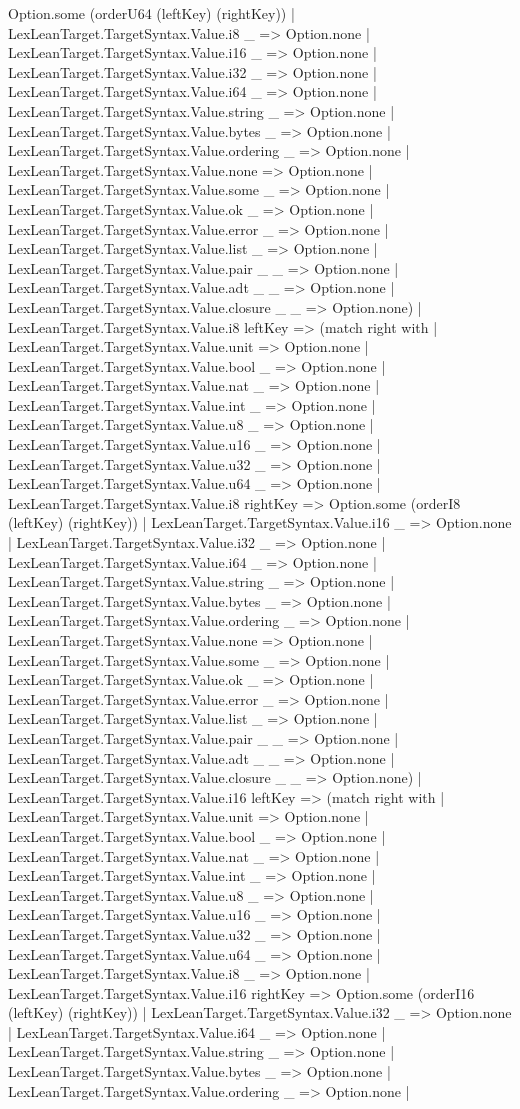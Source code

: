 \documentclass[11pt]{article}
\begin{document}
Option.some (orderU64 (leftKey) (rightKey)) | LexLeanTarget.TargetSyntax.Value.i8 \_ => Option.none | LexLeanTarget.TargetSyntax.Value.i16 \_ => Option.none | LexLeanTarget.TargetSyntax.Value.i32 \_ => Option.none | LexLeanTarget.TargetSyntax.Value.i64 \_ => Option.none | LexLeanTarget.TargetSyntax.Value.string \_ => Option.none | LexLeanTarget.TargetSyntax.Value.bytes \_ => Option.none | LexLeanTarget.TargetSyntax.Value.ordering \_ => Option.none | LexLeanTarget.TargetSyntax.Value.none => Option.none | LexLeanTarget.TargetSyntax.Value.some \_ => Option.none | LexLeanTarget.TargetSyntax.Value.ok \_ => Option.none | LexLeanTarget.TargetSyntax.Value.error \_ => Option.none | LexLeanTarget.TargetSyntax.Value.list \_ => Option.none | LexLeanTarget.TargetSyntax.Value.pair \_ \_ => Option.none | LexLeanTarget.TargetSyntax.Value.adt \_ \_ => Option.none | LexLeanTarget.TargetSyntax.Value.closure \_ \_ => Option.none) | LexLeanTarget.TargetSyntax.Value.i8 leftKey => (match right with | LexLeanTarget.TargetSyntax.Value.unit => Option.none | LexLeanTarget.TargetSyntax.Value.bool \_ => Option.none | LexLeanTarget.TargetSyntax.Value.nat \_ => Option.none | LexLeanTarget.TargetSyntax.Value.int \_ => Option.none | LexLeanTarget.TargetSyntax.Value.u8 \_ => Option.none | LexLeanTarget.TargetSyntax.Value.u16 \_ => Option.none | LexLeanTarget.TargetSyntax.Value.u32 \_ => Option.none | LexLeanTarget.TargetSyntax.Value.u64 \_ => Option.none | LexLeanTarget.TargetSyntax.Value.i8 rightKey => Option.some (orderI8 (leftKey) (rightKey)) | LexLeanTarget.TargetSyntax.Value.i16 \_ => Option.none | LexLeanTarget.TargetSyntax.Value.i32 \_ => Option.none | LexLeanTarget.TargetSyntax.Value.i64 \_ => Option.none | LexLeanTarget.TargetSyntax.Value.string \_ => Option.none | LexLeanTarget.TargetSyntax.Value.bytes \_ => Option.none | LexLeanTarget.TargetSyntax.Value.ordering \_ => Option.none | LexLeanTarget.TargetSyntax.Value.none => Option.none | LexLeanTarget.TargetSyntax.Value.some \_ => Option.none | LexLeanTarget.TargetSyntax.Value.ok \_ => Option.none | LexLeanTarget.TargetSyntax.Value.error \_ => Option.none | LexLeanTarget.TargetSyntax.Value.list \_ => Option.none | LexLeanTarget.TargetSyntax.Value.pair \_ \_ => Option.none | LexLeanTarget.TargetSyntax.Value.adt \_ \_ => Option.none | LexLeanTarget.TargetSyntax.Value.closure \_ \_ => Option.none) | LexLeanTarget.TargetSyntax.Value.i16 leftKey => (match right with | LexLeanTarget.TargetSyntax.Value.unit => Option.none | LexLeanTarget.TargetSyntax.Value.bool \_ => Option.none | LexLeanTarget.TargetSyntax.Value.nat \_ => Option.none | LexLeanTarget.TargetSyntax.Value.int \_ => Option.none | LexLeanTarget.TargetSyntax.Value.u8 \_ => Option.none | LexLeanTarget.TargetSyntax.Value.u16 \_ => Option.none | LexLeanTarget.TargetSyntax.Value.u32 \_ => Option.none | LexLeanTarget.TargetSyntax.Value.u64 \_ => Option.none | LexLeanTarget.TargetSyntax.Value.i8 \_ => Option.none | LexLeanTarget.TargetSyntax.Value.i16 rightKey => Option.some (orderI16 (leftKey) (rightKey)) | LexLeanTarget.TargetSyntax.Value.i32 \_ => Option.none | LexLeanTarget.TargetSyntax.Value.i64 \_ => Option.none | LexLeanTarget.TargetSyntax.Value.string \_ => Option.none | LexLeanTarget.TargetSyntax.Value.bytes \_ => Option.none | LexLeanTarget.TargetSyntax.Value.ordering \_ => Option.none | 
\end{document}
